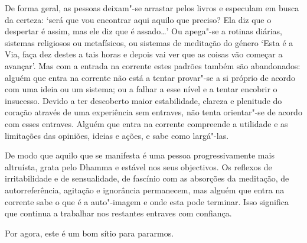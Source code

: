 De forma geral, as pessoas deixam"-se arrastar pelos livros e especulam em busca da certeza: `será que vou encontrar aqui aquilo que preciso? Ela diz que o despertar é assim, mas ele diz que é assado\ldots{}' Ou apega"-se a rotinas diárias, sistemas religiosos ou metafísicos, ou sistemas de meditação do género `Esta é a Via, faça dez destes a tais horas e depois vai ver que as coisas vão começar a avançar'. Mas com a entrada na corrente estes padrões também são abandonados: alguém que entra na corrente não está a tentar provar"-se a si próprio de acordo com uma ideia ou um sistema; ou a falhar a esse nível e a tentar encobrir o insucesso. Devido a ter descoberto maior estabilidade, clareza e plenitude do coração através de uma experiência sem entraves, não tenta orientar"-se de acordo com esses entraves. Alguém que entra na corrente compreende a utilidade e as limitações das opiniões, ideias e ações, e sabe como largá"-las.

De modo que aquilo que se manifesta é uma pessoa progressivamente mais altruísta, grata pelo Dhamma e estável nos seus objectivos. Os reflexos de irritabilidade e de sensualidade, de fascínio com as absorções da meditação, de autorreferência, agitação e ignorância permanecem, mas alguém que entra na corrente sabe o que é a auto"-imagem e onde esta pode terminar. Isso significa que continua a trabalhar nos restantes entraves com confiança.

Por agora, este é um bom sítio para pararmos.
